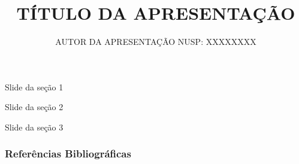 \documentclass[aspectratio=169]{beamer}
\title[SUBTÍTULO DA APRESENTAÇÃO]
      {TÍTULO DA APRESENTAÇÃO}
      []
\author{AUTOR DA APRESENTAÇÃO \quad NUSP: XXXXXXXX}
\begin{document}
\maketitle


\begin{frame}{Slide da seção 1}

\end{frame}


\begin{frame}{Slide da seção 2}

\end{frame}


\begin{frame}{Slide da seção 3}

\end{frame}


\begin{frame}[allowframebreaks]
  \frametitle{Referências Bibliográficas}
  
\end{frame}
\end{document}
